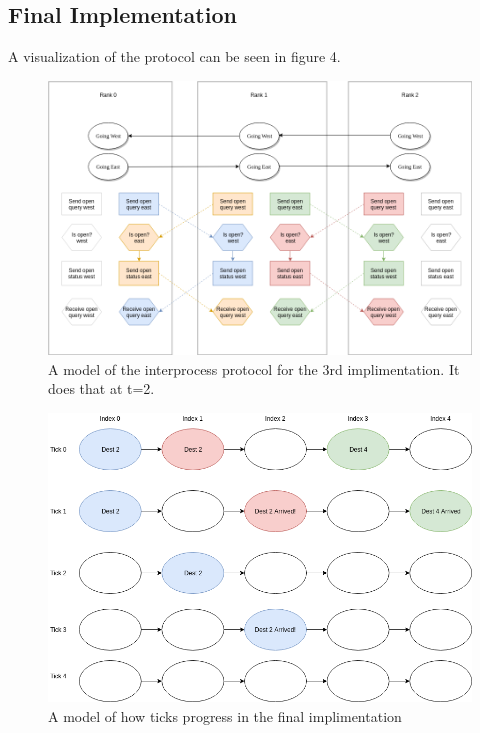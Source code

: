 \documentclass[10pt,a4paper]{article}
\begin{document}
\subsection{Final Implementation}
A visualization of the protocol can be seen in figure 4.

\begin{figure}
    \centering
    \includegraphics[scale=0.4]{imp3_diag.png}
    \caption{A model of the interprocess protocol for the 3rd implimentation. It does that at t=2.}
    \label{fig:my_label}
\end{figure}

\begin{figure}
    \centering
    \includegraphics[scale=0.4]{imp3_sim.png}
    \caption{A model of how ticks progress in the final implimentation}
    \label{fig:my_label}
\end{figure}
\end{document}
